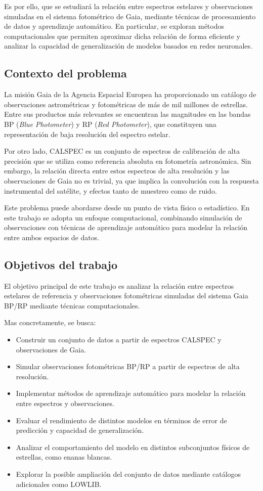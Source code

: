 \documentclass{article}
\begin{document}
Es por ello, que se estudiará la relación entre espectros estelares y observaciones simuladas en el sistema fotométrico de Gaia, mediante técnicas de procesamiento de datos y aprendizaje automático. En particular, se exploran métodos computacionales que permiten aproximar dicha relación de forma eficiente y analizar la capacidad de generalización de modelos basados en redes neuronales.

\subsection{Contexto del problema}

La misión Gaia de la Agencia Espacial Europea ha proporcionado un catálogo de observaciones astrométricas y fotométricas de más de mil millones de estrellas. Entre sus productos más relevantes se encuentran las magnitudes en las bandas BP (\textit{Blue Photometer}) y RP (\textit{Red Photometer}), que constituyen una representación de baja resolución del espectro estelar.

Por otro lado, CALSPEC es un conjunto de espectros de calibración de alta precisión que se utiliza como referencia absoluta en fotometría astronómica. Sin embargo, la relación directa entre estos espectros de alta resolución y las observaciones de Gaia no es trivial, ya que implica la convolución con la respuesta instrumental del satélite, y efectos tanto de muestreo como de ruido.

Este problema puede abordarse desde un punto de vista físico o estadístico. En este trabajo se adopta un enfoque computacional, combinando simulación de observaciones con técnicas de aprendizaje automático para modelar la relación entre ambos espacios de datos. 

\subsection{Objetivos del trabajo}
El objetivo principal de este trabajo es analizar la relación entre espectros estelares de referencia y observaciones fotométricas simuladas del sistema Gaia BP/RP mediante técnicas computacionales.

Mas concretamente, se busca:

\begin{itemize}
    \item Construir un conjunto de datos a partir de espectros CALSPEC y observaciones de Gaia.
    \item Simular observaciones fotométricas BP/RP a partir de espectros de alta resolución.
    \item Implementar métodos de aprendizaje automático para modelar la relación entre espectros y observaciones.
    \item Evaluar el rendimiento de distintos modelos en términos de error de predicción y capacidad de generalización.
    \item Analizar el comportamiento del modelo en distintos subconjuntos físicos de estrellas, como enanas blancas.
    \item Explorar la posible ampliación del conjunto de datos mediante catálogos adicionales como LOWLIB.
\end{itemize}
\end{document}
